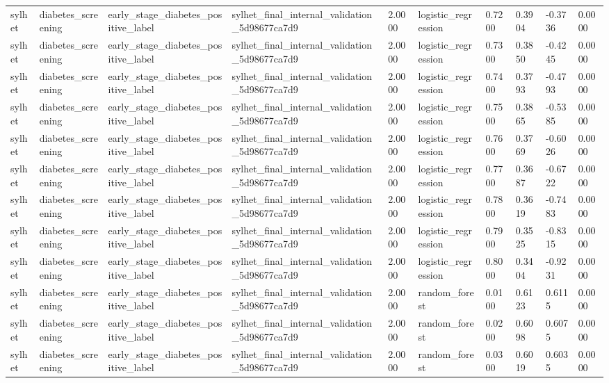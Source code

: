 \begin{tabular}{llllllllll}
sylhet & diabetes\_screening & early\_stage\_diabetes\_positive\_label & sylhet\_final\_internal\_validation\_5d98677ca7d9 & 2.0000 & logistic\_regression & 0.7200 & 0.3904 & -0.3736 & 0.0000 \\
sylhet & diabetes\_screening & early\_stage\_diabetes\_positive\_label & sylhet\_final\_internal\_validation\_5d98677ca7d9 & 2.0000 & logistic\_regression & 0.7300 & 0.3850 & -0.4245 & 0.0000 \\
sylhet & diabetes\_screening & early\_stage\_diabetes\_positive\_label & sylhet\_final\_internal\_validation\_5d98677ca7d9 & 2.0000 & logistic\_regression & 0.7400 & 0.3793 & -0.4793 & 0.0000 \\
sylhet & diabetes\_screening & early\_stage\_diabetes\_positive\_label & sylhet\_final\_internal\_validation\_5d98677ca7d9 & 2.0000 & logistic\_regression & 0.7500 & 0.3865 & -0.5385 & 0.0000 \\
sylhet & diabetes\_screening & early\_stage\_diabetes\_positive\_label & sylhet\_final\_internal\_validation\_5d98677ca7d9 & 2.0000 & logistic\_regression & 0.7600 & 0.3769 & -0.6026 & 0.0000 \\
sylhet & diabetes\_screening & early\_stage\_diabetes\_positive\_label & sylhet\_final\_internal\_validation\_5d98677ca7d9 & 2.0000 & logistic\_regression & 0.7700 & 0.3687 & -0.6722 & 0.0000 \\
sylhet & diabetes\_screening & early\_stage\_diabetes\_positive\_label & sylhet\_final\_internal\_validation\_5d98677ca7d9 & 2.0000 & logistic\_regression & 0.7800 & 0.3619 & -0.7483 & 0.0000 \\
sylhet & diabetes\_screening & early\_stage\_diabetes\_positive\_label & sylhet\_final\_internal\_validation\_5d98677ca7d9 & 2.0000 & logistic\_regression & 0.7900 & 0.3525 & -0.8315 & 0.0000 \\
sylhet & diabetes\_screening & early\_stage\_diabetes\_positive\_label & sylhet\_final\_internal\_validation\_5d98677ca7d9 & 2.0000 & logistic\_regression & 0.8000 & 0.3404 & -0.9231 & 0.0000 \\
sylhet & diabetes\_screening & early\_stage\_diabetes\_positive\_label & sylhet\_final\_internal\_validation\_5d98677ca7d9 & 2.0000 & random\_forest & 0.0100 & 0.6123 & 0.6115 & 0.0000 \\
sylhet & diabetes\_screening & early\_stage\_diabetes\_positive\_label & sylhet\_final\_internal\_validation\_5d98677ca7d9 & 2.0000 & random\_forest & 0.0200 & 0.6098 & 0.6075 & 0.0000 \\
sylhet & diabetes\_screening & early\_stage\_diabetes\_positive\_label & sylhet\_final\_internal\_validation\_5d98677ca7d9 & 2.0000 & random\_forest & 0.0300 & 0.6019 & 0.6035 & 0.0000 \\

\end{tabular}
